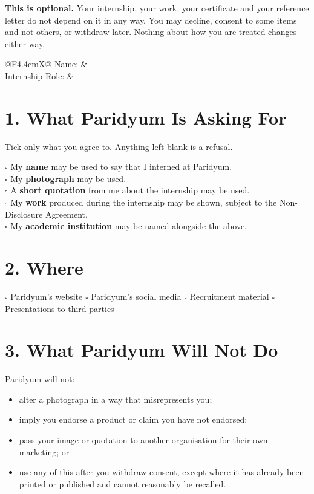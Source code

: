 \documentclass{paridyum}
\begin{document}
\paridyumletterhead
\paridyumdate{\dkDocDate}

\begin{softbox}
\textbf{This is optional.} Your internship, your work, your certificate and
your reference letter do not depend on it in any way. You may decline, consent
to some items and not others, or withdraw later. Nothing about how you are
treated changes either way.
\end{softbox}

\vspace{0.7em}
\begin{tabularx}{\linewidth}{@{}F{4.4cm}X@{}}
Name:            &  \\[0.5em]
Internship Role: & 
\end{tabularx}

\section*{1. What Paridyum Is Asking For}
Tick only what you agree to. Anything left blank is a refusal.

\vspace{0.5em}
$\square$ \quad My \textbf{name} may be used to say that I interned at Paridyum. \\[0.4em]
$\square$ \quad My \textbf{photograph} may be used. \\[0.4em]
$\square$ \quad A \textbf{short quotation} from me about the internship may be used. \\[0.4em]
$\square$ \quad My \textbf{work} produced during the internship may be shown, subject
to the Non-Disclosure Agreement. \\[0.4em]
$\square$ \quad My \textbf{academic institution} may be named alongside the above.

\section*{2. Where}
\vspace{0.3em}
$\square$ Paridyum's website \quad
$\square$ Paridyum's social media \quad
$\square$ Recruitment material \quad
$\square$ Presentations to third parties

\section*{3. What Paridyum Will Not Do}
Paridyum will not:
\begin{itemize}[leftmargin=*, noitemsep]
    \item alter a photograph in a way that misrepresents you;
    \item imply you endorse a product or claim you have not endorsed;
    \item pass your image or quotation to another organisation for their own
          marketing; or
    \item use any of this after you withdraw consent, except where it has
          already been printed or published and cannot reasonably be recalled.
\end{itemize}
\end{document}
